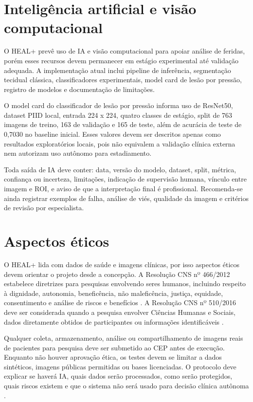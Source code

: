 \documentclass[
    12pt,
    oneside,
    a4paper,
    chapter=TITLE,
    brazil,
    sumario=tradicional,
    hidelinks
]{abntex2}
\begin{document}
\chapter{Inteligência artificial e visão computacional}

O HEAL+ prevê uso de IA e visão computacional para apoiar análise de feridas, porém esses recursos devem permanecer em estágio experimental até validação adequada. A implementação atual inclui pipeline de inferência, segmentação tecidual clássica, classificadores experimentais, model card de lesão por pressão, registro de modelos e documentação de limitações.

O model card do classificador de lesão por pressão informa uso de ResNet50, dataset PIID local, entrada 224 x 224, quatro classes de estágio, split de 763 imagens de treino, 163 de validação e 165 de teste, além de acurácia de teste de 0,7030 no baseline inicial. Esses valores devem ser descritos apenas como resultados exploratórios locais, pois não equivalem a validação clínica externa nem autorizam uso autônomo para estadiamento.

Toda saída de IA deve conter: data, versão do modelo, dataset, split, métrica, confiança ou incerteza, limitações, indicação de supervisão humana, vínculo entre imagem e ROI, e aviso de que a interpretação final é profissional. Recomenda-se ainda registrar exemplos de falha, análise de viés, qualidade da imagem e critérios de revisão por especialista.

\chapter{Aspectos éticos}

O HEAL+ lida com dados de saúde e imagens clínicas, por isso aspectos éticos devem orientar o projeto desde a concepção. A Resolução CNS nº 466/2012 estabelece diretrizes para pesquisas envolvendo seres humanos, incluindo respeito à dignidade, autonomia, beneficência, não maleficência, justiça, equidade, consentimento e análise de riscos e benefícios \cite{brasil2012}. A Resolução CNS nº 510/2016 deve ser considerada quando a pesquisa envolver Ciências Humanas e Sociais, dados diretamente obtidos de participantes ou informações identificáveis \cite{brasil2016}.

Qualquer coleta, armazenamento, análise ou compartilhamento de imagens reais de pacientes para pesquisa deve ser submetido ao CEP antes de execução. Enquanto não houver aprovação ética, os testes devem se limitar a dados sintéticos, imagens públicas permitidas ou bases licenciadas. O protocolo deve explicar se haverá IA, quais dados serão processados, como serão protegidos, quais riscos existem e que o sistema não será usado para decisão clínica autônoma \cite{who2021,brasil2012}.
\end{document}
